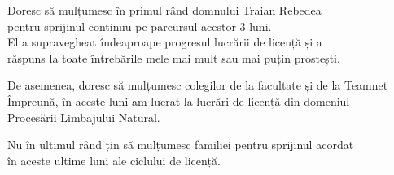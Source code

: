 \vspace*{7cm}
\begin{center}
Doresc să mulțumesc în primul rând domnului Traian Rebedea\\
pentru sprijinul continuu pe parcursul acestor 3 luni.\\
El a supravegheat îndeaproape progresul lucrării de licență și a\\
răspuns la toate întrebările mele mai mult sau mai puțin prostești.

De asemenea, doresc să mulțumesc colegilor de la facultate și de la Teamnet\\
Împreună, în aceste luni am lucrat la lucrări de licență din domeniul\\
Procesării Limbajului Natural.


\end{center}
\vspace{0.6cm}
\begin{center}
Nu în ultimul rând țin să mulțumesc familiei pentru sprijinul acordat\\
în aceste ultime luni ale ciclului de licență.
\end{center}

